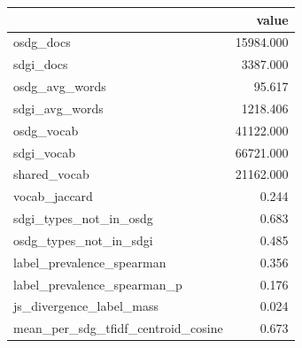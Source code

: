 \begin{tabular}{lr}
\toprule
 & value \\
\midrule
osdg_docs & 15984.000 \\
sdgi_docs & 3387.000 \\
osdg_avg_words & 95.617 \\
sdgi_avg_words & 1218.406 \\
osdg_vocab & 41122.000 \\
sdgi_vocab & 66721.000 \\
shared_vocab & 21162.000 \\
vocab_jaccard & 0.244 \\
sdgi_types_not_in_osdg & 0.683 \\
osdg_types_not_in_sdgi & 0.485 \\
label_prevalence_spearman & 0.356 \\
label_prevalence_spearman_p & 0.176 \\
js_divergence_label_mass & 0.024 \\
mean_per_sdg_tfidf_centroid_cosine & 0.673 \\
\bottomrule
\end{tabular}
